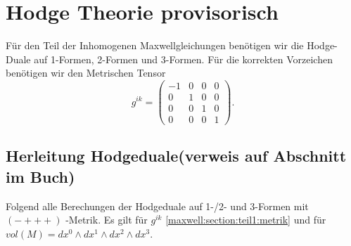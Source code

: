 %
%
%
%
\section{Hodge Theorie provisorisch
\label{maxwell:section:teil1}}
Für den Teil der Inhomogenen Maxwellgleichungen benötigen wir die Hodge-Duale auf 1-Formen, 2-Formen und 3-Formen.
Für die korrekten Vorzeichen benötigen wir den Metrischen Tensor
\begin{equation}
g^{ik} = \begin{pmatrix}
	-1 & 0 & 0 & 0 \\ 0 & 1 & 0 & 0 \\ 0 & 0 & 1 & 0 \\ 0 & 0 & 0 & 1 
\end{pmatrix}.
\label{maxwell:section:teil1:metrik}
\end{equation}

\subsection{Herleitung Hodgeduale(verweis auf Abschnitt im Buch)}
Folgend alle Berechungen der Hodgeduale auf 1-/2- und 3-Formen mit $(-+++)$ -Metrik.
Es gilt für $g^{ik}$ \eqref{maxwell:section:teil1:metrik} und für $ vol(M) = dx^0 \wedge dx^1 \wedge dx^2 \wedge dx^3$.


